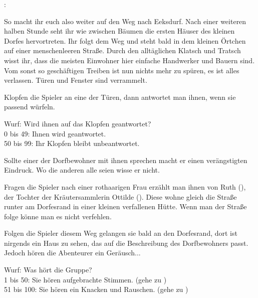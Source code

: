 :

So macht ihr euch also weiter auf den Weg nach Eeksdurf. Nach einer weiteren halben Stunde seht ihr wie zwischen Bäumen die ersten Häuser des kleinen Dorfes hervortreten. Ihr folgt dem Weg und steht bald in dem kleinen Örtchen auf einer menschenleeren Straße. Durch den alltäglichen Klatsch und Tratsch wisst ihr, dass die meisten Einwohner hier einfache Handwerker und Bauern sind. Vom sonst so geschäftigen Treiben ist nun nichts mehr zu spüren, es ist alles verlassen. Türen und Fenster sind verrammelt.

Klopfen die Spieler an eine der Türen, dann antwortet man ihnen, wenn sie passend würfeln.

\begin{tcolorbox}
  Wurf: Wird ihnen auf das Klopfen geantwortet? \\
  0 bis 49: Ihnen wird geantwortet. \\
  50 bis 99: Ihr Klopfen bleibt unbeantwortet.\\
\end{tcolorbox}

Sollte einer der Dorfbewohner mit ihnen sprechen macht er einen verängstigten Eindruck. Wo die anderen alle seien wisse er nicht.


Fragen die Spieler nach einer rothaarigen Frau erzählt man ihnen von Ruth (\blue{\ref{Ruth}}), der Tochter der Kräutersammlerin Ottilde (\blue{\ref{Ottilde}}). Diese wohne gleich die Straße runter am Dorfesrand in einer kleinen verfallenen Hütte. Wenn man der Straße folge könne man es nicht verfehlen.


Folgen die Spieler diesem Weg gelangen sie bald an den Dorfesrand, dort ist nirgends ein Haus zu sehen, das auf die Beschreibung des Dorfbewohners passt. Jedoch hören die Abenteurer ein Geräusch...

\begin{tcolorbox}
  Wurf: Was hört die Gruppe? \\
  1 bis 50: Sie hören aufgebrachte Stimmen. (gehe zu \blue{\ref{mob}})\\
  51 bis 100: Sie hören ein Knacken und Rauschen. (gehe zu \blue{\ref{feuer}})\\
\end{tcolorbox}

